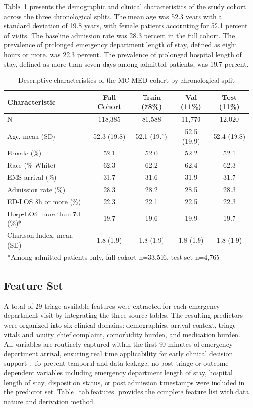 \documentclass[harvard,article]{frontiersinFPHY_FAMS}
\begin{document}
Table~\ref{tab:descriptive} presents the demographic and clinical characteristics of the study cohort across the three chronological splits. The mean age was 52.3 years with a standard deviation of 19.8 years, with female patients accounting for 52.1 percent of visits. The baseline admission rate was 28.3 percent in the full cohort. The prevalence of prolonged emergency department length of stay, defined as eight hours or more, was 22.3 percent. The prevalence of prolonged hospital length of stay, defined as more than seven days among admitted patients, was 19.7 percent.

\begin{table}[t]
\centering
\caption{Descriptive characteristics of the MC-MED cohort by chronological split}
\label{tab:descriptive}
\begin{tabular}{lcccc}
\toprule
Characteristic & Full Cohort & Train (78\%) & Val (11\%) & Test (11\%) \\
\midrule
N & 118,385 & 81,588 & 11,770 & 12,020 \\
Age, mean (SD) & 52.3 (19.8) & 52.1 (19.7) & 52.5 (19.9) & 52.4 (19.8) \\
Female (\%) & 52.1 & 52.0 & 52.2 & 52.1 \\
Race (\% White) & 62.3 & 62.2 & 62.4 & 62.3 \\
EMS arrival (\%) & 31.7 & 31.6 & 31.9 & 31.7 \\
Admission rate (\%) & 28.3 & 28.2 & 28.5 & 28.3 \\
ED-LOS 8h or more (\%) & 22.3 & 22.1 & 22.5 & 22.3 \\
Hosp-LOS more than 7d (\%)* & 19.7 & 19.6 & 19.9 & 19.7 \\
Charlson Index, mean (SD) & 1.8 (1.9) & 1.8 (1.9) & 1.8 (1.9) & 1.8 (1.9) \\
\bottomrule
\multicolumn{5}{l}{*Among admitted patients only, full cohort n=33,516, test set n=4,765} \\
\end{tabular}
\end{table}

\subsection{Feature Set}

A total of 29 triage available features were extracted for each emergency department visit by integrating the three source tables. The resulting predictors were organized into six clinical domains: demographics, arrival context, triage vitals and acuity, chief complaint, comorbidity burden, and medication burden. All variables are routinely captured within the first 90 minutes of emergency department arrival, ensuring real time applicability for early clinical decision support \cite{levin2020}. To prevent temporal and data leakage, no post triage or outcome dependent variables including emergency department length of stay, hospital length of stay, disposition status, or post admission timestamps were included in the predictor set. Table~\ref{tab:features} provides the complete feature list with data nature and derivation method.
\end{document}
